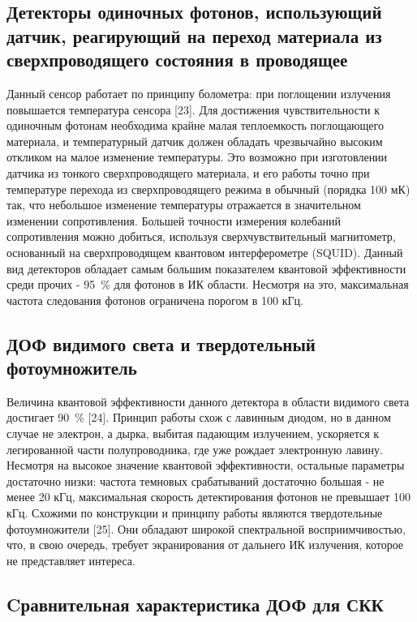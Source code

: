 \subsection{Детекторы одиночных фотонов, использующий датчик, реагирующий на переход материала из сверхпроводящего состояния в проводящее} \label{subsec:ch1/sec5/sub5}

Данный сенсор работает по принципу болометра: при поглощении излучения повышается температура сенсора [23]. Для достижения чувствительности к одиночным фотонам необходима крайне малая теплоемкость поглощающего материала, и температурный датчик должен обладать чрезвычайно высоким откликом на малое изменение температуры. Это возможно при изготовлении датчика из тонкого сверхпроводящего материала, и его работы точно при температуре перехода из сверхпроводящего режима в обычный (порядка 100 мК) так, что небольшое изменение температуры отражается в значительном изменении сопротивления. Большей точности измерения колебаний сопротивления можно добиться, используя сверхчувствительный магнитометр, основанный на сверхпроводящем квантовом интерферометре (SQUID). Данный вид детекторов обладает самым большим показателем квантовой эффективности среди прочих - 95~\% для фотонов в ИК области. Несмотря на это, максимальная частота следования фотонов ограничена порогом в 100 кГц.

\subsection{ДОФ видимого света и твердотельный фотоумножитель} \label{subsec:ch1/sec5/sub6}

Величина квантовой эффективности данного детектора в области видимого света достигает 90~\% [24]. Принцип работы схож с лавинным диодом, но в данном случае не электрон, а дырка, выбитая падающим излучением, ускоряется к легированной части полупроводника, где уже рождает электронную лавину. Несмотря на высокое значение квантовой эффективности, остальные параметры достаточно низки: частота темновых срабатываний достаточно большая - не менее 20 кГц, максимальная скорость детектирования фотонов не превышает 100 кГц. Схожими по конструкции и принципу работы являются твердотельные фотоумножители [25]. Они обладают широкой спектральной восприимчивостью, что, в свою очередь, требует экранирования от дальнего ИК излучения, которое не представляет интереса.

\subsection{Cравнительная характеристика ДОФ для СКК} \label{subsec:ch1/sec5/sub7}

